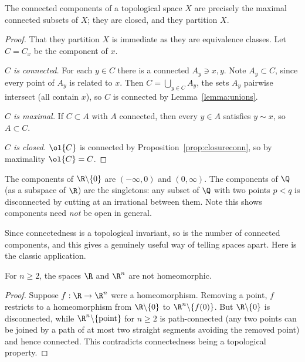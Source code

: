 \begin{proposition}
    The connected components of a topological space $X$ are precisely the maximal connected subsets of $X$; they are closed, and they partition $X$.
\end{proposition}
\begin{proof}
    That they partition $X$ is immediate as they are equivalence classes. Let $C = C_x$ be the component of $x$.

    \emph{$C$ is connected.} For each $y \in C$ there is a connected $A_y \ni x, y$. Note $A_y \subset C$, since every point of $A_y$ is related to $x$. Then $C = \bigcup_{y \in C} A_y$, the sets $A_y$ pairwise intersect (all contain $x$), so $C$ is connected by Lemma~\ref{lemma:unions}.

    \emph{$C$ is maximal.} If $C \subset A$ with $A$ connected, then every $y \in A$ satisfies $y \sim x$, so $A \subset C$.

    \emph{$C$ is closed.} $\ol{C}$ is connected by Proposition~\ref{prop:closureconn}, so by maximality $\ol{C} = C$.
\end{proof}

\begin{example}
    The components of $\R \backslash \{0\}$ are $(-\infty, 0)$ and $(0, \infty)$. The components of $\Q$ (as a subspace of $\R$) are the singletons: any subset of $\Q$ with two points $p < q$ is disconnected by cutting at an irrational between them. Note this shows components need \emph{not} be open in general.
\end{example}

Since connectedness is a topological invariant, so is the number of connected components, and this gives a genuinely useful way of telling spaces apart. Here is the classic application.

\begin{theorem}
    For $n \geq 2$, the spaces $\R$ and $\R^n$ are not homeomorphic.
\end{theorem}
\begin{proof}
    Suppose $f: \R \rightarrow \R^n$ were a homeomorphism. Removing a point, $f$ restricts to a homeomorphism from $\R \backslash \{0\}$ to $\R^n \backslash \{f(0)\}$. But $\R \backslash \{0\}$ is disconnected, while $\R^n \backslash \{\text{point}\}$ for $n \geq 2$ is path-connected (any two points can be joined by a path of at most two straight segments avoiding the removed point) and hence connected. This contradicts connectedness being a topological property.
\end{proof}


